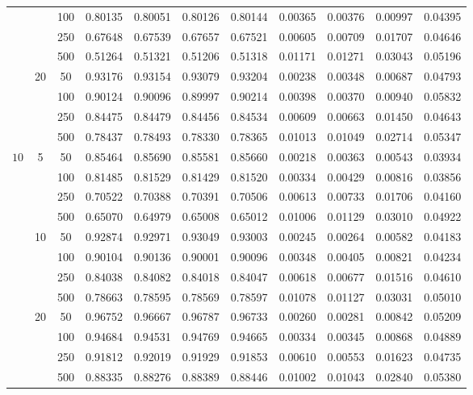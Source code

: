 \documentclass[10pt]{article}
\begin{document}
\begin{center}
\begin{longtable}{ccccccccccc}
		&&100& 0.80135 & 0.80051 & 0.80126 & 0.80144 & 0.00365 & 0.00376 & 0.00997 & 0.04395 \\ \cline{3-11}
		&&250& 0.67648 & 0.67539 & 0.67657 & 0.67521 & 0.00605 & 0.00709 & 0.01707 & 0.04646 \\ \cline{3-11}
		&&500& 0.51264 & 0.51321 & 0.51206 & 0.51318 & 0.01171 & 0.01271 & 0.03043 & 0.05196 \\ \cline{2-11}
		& \multirow{4}{*}{20}&50& 0.93176 & 0.93154 & 0.93079 & 0.93204 & 0.00238 & 0.00348 & 0.00687 & 0.04793 \\ \cline{3-11}
		&&100& 0.90124 & 0.90096 & 0.89997 & 0.90214 & 0.00398 & 0.00370 & 0.00940 & 0.05832 \\ \cline{3-11}
		&&250& 0.84475 & 0.84479 & 0.84456 & 0.84534 & 0.00609 & 0.00663 & 0.01450 & 0.04643 \\ \cline{3-11}
		&&500& 0.78437 & 0.78493 & 0.78330 & 0.78365 & 0.01013 & 0.01049 & 0.02714 & 0.05347 \\ \hline
		\multirow{12}{*}{$10$}
		& \multirow{4}{*}{5}&50 & 0.85464 & 0.85690 & 0.85581 & 0.85660 & 0.00218 & 0.00363 & 0.00543 & 0.03934 \\ \cline{3-11}
		&&100 & 0.81485 & 0.81529 & 0.81429 & 0.81520 & 0.00334 & 0.00429 & 0.00816 & 0.03856 \\ \cline{3-11}
		&&250 & 0.70522 & 0.70388 & 0.70391 & 0.70506 & 0.00613 & 0.00733 & 0.01706 & 0.04160 \\ \cline{3-11}
		&&500 & 0.65070 & 0.64979 & 0.65008 & 0.65012 & 0.01006 & 0.01129 & 0.03010 & 0.04922 \\ \cline{2-11}
		& \multirow{4}{*}{10}&50& 0.92874 & 0.92971 & 0.93049 & 0.93003 & 0.00245 & 0.00264 & 0.00582 & 0.04183 \\ \cline{3-11}
		&&100& 0.90104 & 0.90136 & 0.90001 & 0.90096 & 0.00348 & 0.00405 & 0.00821 & 0.04234 \\ \cline{3-11}
		&&250& 0.84038 & 0.84082 & 0.84018 & 0.84047 & 0.00618 & 0.00677 & 0.01516 & 0.04610 \\ \cline{3-11}
		&&500& 0.78663 & 0.78595 & 0.78569 & 0.78597 & 0.01078 & 0.01127 & 0.03031 & 0.05010 \\ \cline{2-11}
		& \multirow{4}{*}{20}&50& 0.96752 & 0.96667 & 0.96787 & 0.96733 & 0.00260 & 0.00281 & 0.00842 & 0.05209 \\ \cline{3-11}
		&&100& 0.94684 & 0.94531 & 0.94769 & 0.94665 & 0.00334 & 0.00345 & 0.00868 & 0.04889 \\ \cline{3-11}
		&&250& 0.91812 & 0.92019 & 0.91929 & 0.91853 & 0.00610 & 0.00553 & 0.01623 & 0.04735 \\ \cline{3-11}
		&&500& 0.88335 & 0.88276 & 0.88389 & 0.88446 & 0.01002 & 0.01043 & 0.02840 & 0.05380 \\ \hline
	\end{longtable}
\end{center}
\end{document}
